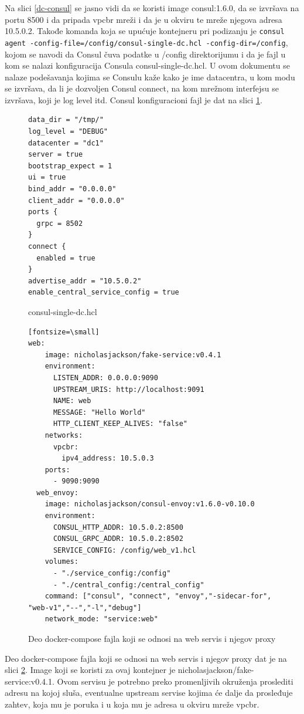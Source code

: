 \documentclass[a4paper,12pt]{report}
\begin{document}
Na slici \ref{dc-consul} se jasno vidi da se koristi image consul:1.6.0, da se izvršava na portu 8500 i da pripada vpcbr mreži i da je u okviru te mreže njegova adresa 10.5.0.2. Takođe komanda koja se upućuje kontejneru pri podizanju je \texttt{consul agent -config-file=/config/consul-single-dc.hcl -config-dir=/config}, kojom se navodi da Consul čuva podatke u /config direktorijumu i da je fajl u kom se nalazi konfiguracija Consula consul-single-dc.hcl. U ovom dokumentu se nalaze podešavanja kojima se Consulu kaže kako je ime datacentra, u kom modu se izvršava, da li je dozvoljen Consul connect, na kom mrežnom interfejsu se izvršava, koji je log level itd. Consul konfiguracioni fajl je dat na slici \ref{hcl}. 

\begin{figure}[h]
\begin{verbatim}
data_dir = "/tmp/"
log_level = "DEBUG"
datacenter = "dc1"
server = true
bootstrap_expect = 1
ui = true
bind_addr = "0.0.0.0"
client_addr = "0.0.0.0"
ports {
  grpc = 8502
}
connect {
  enabled = true
}
advertise_addr = "10.5.0.2"
enable_central_service_config = true
\end{verbatim}
    \caption{consul-single-dc.hcl}
    \label{hcl}
\end{figure} 


\begin{figure}[h]
\begin{verbatim}[fontsize=\small]
web:
    image: nicholasjackson/fake-service:v0.4.1
    environment:
      LISTEN_ADDR: 0.0.0.0:9090
      UPSTREAM_URIS: http://localhost:9091
      NAME: web
      MESSAGE: "Hello World"
      HTTP_CLIENT_KEEP_ALIVES: "false"
    networks:
      vpcbr:
        ipv4_address: 10.5.0.3
    ports:
      - 9090:9090
  web_envoy:
    image: nicholasjackson/consul-envoy:v1.6.0-v0.10.0
    environment:
      CONSUL_HTTP_ADDR: 10.5.0.2:8500
      CONSUL_GRPC_ADDR: 10.5.0.2:8502
      SERVICE_CONFIG: /config/web_v1.hcl
    volumes:
      - "./service_config:/config"
      - "./central_config:/central_config"
    command: ["consul", "connect", "envoy","-sidecar-for", "web-v1","--","-l","debug"]
    network_mode: "service:web"
\end{verbatim}
    \caption{Deo docker-compose fajla koji se odnosi na web servis i njegov proxy}
    \label{web-service-dc}
\end{figure}

Deo docker-compose fajla koji se odnosi na web servis i njegov proxy dat je na slici \ref{web-service-dc}. Image koji se koristi za ovaj kontejner je nicholasjackson/fake-service:v0.4.1. Ovom servisu je potrebno preko promenljivih okruženja proslediti adresu na kojoj sluša, eventualne upstream servise kojima će dalje da prosleđuje zahtev, koja mu je poruka i u koja mu je adresa u okviru mreže vpcbr. \newline
\end{document}
